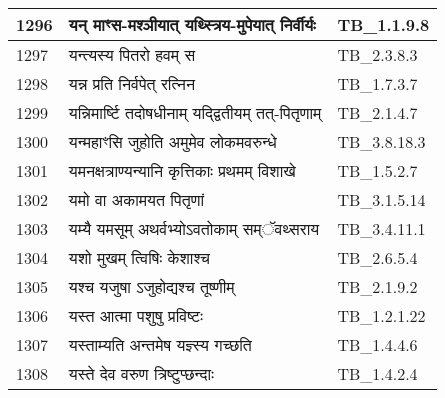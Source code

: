 \documentclass[17pt]{extarticle}
\begin{document}
\begin{longtable}{||p{0.4in}||p{4.9in}||p{0.9in}||}
    1296 & यन् माꣳस{-}मश्ञीयात् यथ्स्त्रिय{-}मुपेयात् निर्वीर्यः & TB\_1.1.9.8       \\
    
    \hline
        
    1297 & यन्त्यस्य पितरो हवम् स & TB\_2.3.8.3       \\
    
    \hline
        
    1298 & यन्न प्रति निर्वपेत् रत्निन & TB\_1.7.3.7       \\
    
    \hline
        
    1299 & यन्निमार्ष्टि तदोषधीनाम् यद्द्वितीयम् तत्{-}पितृणाम् & TB\_2.1.4.7       \\
    
    \hline
        
    1300 & यन्महाꣳसि जुहोति अमुमेव लोकमवरुन्धे & TB\_3.8.18.3       \\
    
    \hline
        
    1301 & यमनक्षत्राण्यन्यानि कृत्तिकाः प्रथमम् विशाखे & TB\_1.5.2.7       \\
    
    \hline
        
    1302 & यमो वा अकामयत पितृणां & TB\_3.1.5.14       \\
    
    \hline
        
    1303 & यम्यै यमसूम् अथर्वभ्योऽवतोकाम् सम्ॅवथ्सराय & TB\_3.4.11.1       \\
    
    \hline
        
    1304 & यशो मुखम् त्विषिः केशाश्च & TB\_2.6.5.4       \\
    
    \hline
        
    1305 & यश्च यजुषा ऽजुहोद्यश्च तूष्णीम् & TB\_2.1.9.2       \\
    
    \hline
        
    1306 & यस्त आत्मा पशुषु प्रविष्टः & TB\_1.2.1.22       \\
    
    \hline
        
    1307 & यस्ताम्यति अन्तमेष यज्ञ्स्य गच्छति & TB\_1.4.4.6       \\
    
    \hline
        
    1308 & यस्ते देव वरुण त्रिष्टुप्छन्दाः & TB\_1.4.2.4       \\
    

\end{longtable}
\end{document}
